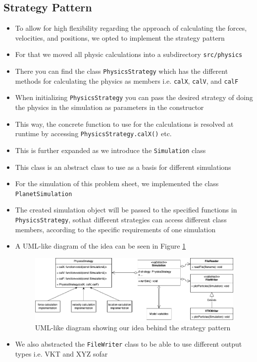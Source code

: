 \documentclass{article}
\begin{document}
\subsection{Strategy Pattern}
\begin{itemize}
    \item To allow for high flexibility regarding the approach of calculating the forces, velocities, and positions, we opted to implement the strategy pattern
    \item For that we moved all physic calculations into a subdirectory \verb|src/physics|
    \item There you can find the class \verb|PhysicsStrategy| which has the different methods for calculating the physics as members i.e. \verb|calX|, \verb|calV|, and \verb|calF|
    \item When initializing \verb|PhysicsStrategy| you can pass the desired strategy of doing the physics in the simulation as parameters in the constructor
    \item This way, the concrete function to use for the calculations is resolved at runtime by accessing \verb|PhysicsStrategy.calX()| etc.
    \item This is further expanded as we introduce the \verb|Simulation| class
    \item This class is an abstract class to use as a basis for different simulations
    \item For the simulation of this problem sheet, we implemented the class \verb|PlanetSimulation|
    \item The created simulation object will be passed to the specified functions in \verb|PhysicsStrategy|, sothat different strategies can access different class members, according to the specific requirements of one simulation
    \item A UML-like diagram of the idea can be seen in Figure \ref{fig:strat}
    \begin{figure}[h]
        \includegraphics[width=\textwidth]{res/strategy_long.png}
        \caption{UML-like diagram showing our idea behind the strategy pattern}
        \label{fig:strat}
    \end{figure}
    \item We also abstracted the \verb|FileWriter| class to be able to use different output types i.e. VKT and XYZ sofar
\end{itemize}
\end{document}
